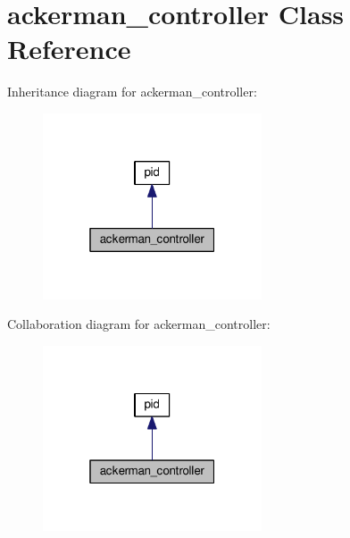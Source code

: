 \hypertarget{classackerman__controller}{}\section{ackerman\+\_\+controller Class Reference}
\label{classackerman__controller}


Inheritance diagram for ackerman\+\_\+controller\+:
\nopagebreak
\begin{figure}[H]
\begin{center}
\leavevmode
\includegraphics[width=184pt]{classackerman__controller__inherit__graph}
\end{center}
\end{figure}


Collaboration diagram for ackerman\+\_\+controller\+:
\nopagebreak
\begin{figure}[H]
\begin{center}
\leavevmode
\includegraphics[width=184pt]{classackerman__controller__coll__graph}
\end{center}
\end{figure}
